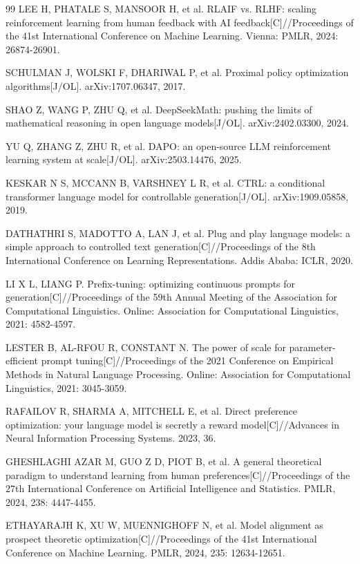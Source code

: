 \documentclass[fontset=fandol,type=master,campus=shenzhen,etitleauto=true]{hithesisbook}
\begin{document}
\begin{thebibliography}{99}
 LEE H, PHATALE S, MANSOOR H, et al. RLAIF vs. RLHF: scaling reinforcement learning from human feedback with AI feedback[C]//Proceedings of the 41st International Conference on Machine Learning. Vienna: PMLR, 2024: 26874-26901.

 SCHULMAN J, WOLSKI F, DHARIWAL P, et al. Proximal policy optimization algorithms[J/OL]. arXiv:1707.06347, 2017.

 SHAO Z, WANG P, ZHU Q, et al. DeepSeekMath: pushing the limits of mathematical reasoning in open language models[J/OL]. arXiv:2402.03300, 2024.

 YU Q, ZHANG Z, ZHU R, et al. DAPO: an open-source LLM reinforcement learning system at scale[J/OL]. arXiv:2503.14476, 2025.

 KESKAR N S, MCCANN B, VARSHNEY L R, et al. CTRL: a conditional transformer language model for controllable generation[J/OL]. arXiv:1909.05858, 2019.

 DATHATHRI S, MADOTTO A, LAN J, et al. Plug and play language models: a simple approach to controlled text generation[C]//Proceedings of the 8th International Conference on Learning Representations. Addis Ababa: ICLR, 2020.

 LI X L, LIANG P. Prefix-tuning: optimizing continuous prompts for generation[C]//Proceedings of the 59th Annual Meeting of the Association for Computational Linguistics. Online: Association for Computational Linguistics, 2021: 4582-4597.

 LESTER B, AL-RFOU R, CONSTANT N. The power of scale for parameter-efficient prompt tuning[C]//Proceedings of the 2021 Conference on Empirical Methods in Natural Language Processing. Online: Association for Computational Linguistics, 2021: 3045-3059.

 RAFAILOV R, SHARMA A, MITCHELL E, et al. Direct preference optimization: your language model is secretly a reward model[C]//Advances in Neural Information Processing Systems. 2023, 36.

 GHESHLAGHI AZAR M, GUO Z D, PIOT B, et al. A general theoretical paradigm to understand learning from human preferences[C]//Proceedings of the 27th International Conference on Artificial Intelligence and Statistics. PMLR, 2024, 238: 4447-4455.

 ETHAYARAJH K, XU W, MUENNIGHOFF N, et al. Model alignment as prospect theoretic optimization[C]//Proceedings of the 41st International Conference on Machine Learning. PMLR, 2024, 235: 12634-12651.


\end{thebibliography}
\end{document}
